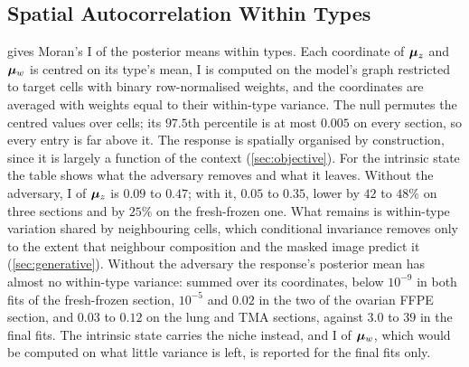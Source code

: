 \subsection{Spatial Autocorrelation Within Types}
\label{app:moran}

 gives Moran's I of the posterior means within types. Each coordinate of $\boldsymbol{\mu}_z$ and $\boldsymbol{\mu}_w$ is centred on its type's mean, I is computed on the model's graph restricted to target cells with binary row-normalised weights, and the coordinates are averaged with weights equal to their within-type variance. The null permutes the centred values over cells; its $97.5$th percentile is at most $0.005$ on every section, so every entry is far above it. The response is spatially organised by construction, since it is largely a function of the context (\cref{sec:objective}). For the intrinsic state the table shows what the adversary removes and what it leaves. Without the adversary, I of $\boldsymbol{\mu}_z$ is $0.09$ to $0.47$; with it, $0.05$ to $0.35$, lower by $42$ to $48\%$ on three sections and by $25\%$ on the fresh-frozen one. What remains is within-type variation shared by neighbouring cells, which conditional invariance removes only to the extent that neighbour composition and the masked image predict it (\cref{sec:generative}). Without the adversary the response's posterior mean has almost no within-type variance: summed over its coordinates, below $10^{-9}$ in both fits of the fresh-frozen section, $10^{-5}$ and $0.02$ in the two of the ovarian FFPE section, and $0.03$ to $0.12$ on the lung and TMA sections, against $3.0$ to $39$ in the final fits. The intrinsic state carries the niche instead, and I of $\boldsymbol{\mu}_w$, which would be computed on what little variance is left, is reported for the final fits only.

